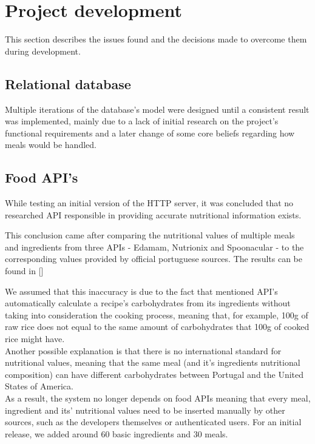 %
%
\chapter{Project development}

    This section describes the issues found and the decisions made
    to overcome them during development.

    \section{Relational database}

    Multiple iterations of the database's model were designed until a consistent result was implemented,
    mainly due to a lack of initial research on the project's functional requirements and a later change
    of some core beliefs regarding how meals would be handled.\\

    \section{Food API's}

    While testing an initial version of the HTTP server,
    it was concluded that no researched API responsible in
    providing accurate nutritional information exists.

    This conclusion came after comparing the nutritional values of multiple
    meals and ingredients from three APIs - Edamam, Nutrionix and Spoonacular -
    to the corresponding values provided by official portuguese sources. 
    The results can be found in []

    We assumed that this inaccuracy is due to the fact that
    mentioned API's automatically calculate a recipe's carbohydrates
    from its ingredients without taking into consideration the cooking process, meaning that, for example,  
    100g of raw rice does not equal to the same amount of carbohydrates that 100g of 
    cooked rice might have.\\

    Another possible explanation is that there is no international standard for nutritional values,
    meaning that the same meal (and it's ingredients nutritional composition) 
    can have different carbohydrates between Portugal and the United States of America.\\
    
    As a result, the system no longer depends on food APIs meaning that every meal, ingredient and its' nutritional values
    need to be inserted manually by other sources, such as the developers themselves or authenticated users.
    For an initial release, we added around 60 basic ingredients and 30 meals.\\
    
